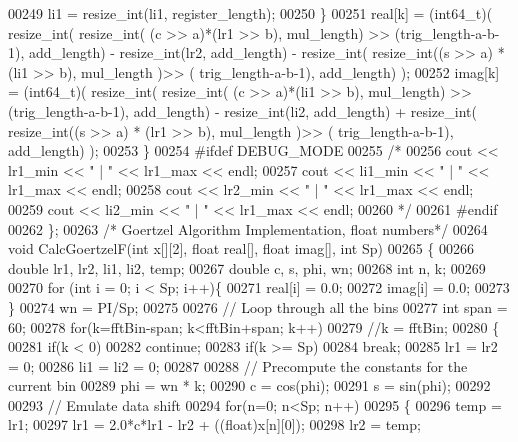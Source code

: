 \begin{DoxyCode}
00249       li1 = resize_int(li1, register\_length);
00250     \}
00251     real[k] = (int64\_t)( resize_int( resize_int( (c >> a)*(lr1 >> b), mul\_length) >> (trig\_length-a-b-1), 
      add\_length) - resize_int(lr2, add\_length) - resize_int( resize_int((s >> a) * (li1 >> b), mul\_length )>> (
      trig\_length-a-b-1), add\_length) );
00252     imag[k] = (int64\_t)( resize_int( resize_int( (c >> a)*(li1 >> b), mul\_length) >> (trig\_length-a-b-1), 
      add\_length) - resize_int(li2, add\_length) + resize_int( resize_int((s >> a) * (lr1 >> b), mul\_length )>> (
      trig\_length-a-b-1), add\_length) );
00253   \}
00254 \textcolor{preprocessor}{  #ifdef DEBUG\_MODE}
00255     \textcolor{comment}{/*}
00256 \textcolor{comment}{    cout << lr1\_min << " | " << lr1\_max << endl;}
00257 \textcolor{comment}{    cout << li1\_min << " | " << lr1\_max << endl;}
00258 \textcolor{comment}{    cout << lr2\_min << " | " << lr1\_max << endl;}
00259 \textcolor{comment}{    cout << li2\_min << " | " << lr1\_max << endl;}
00260 \textcolor{comment}{    */}
00261 \textcolor{preprocessor}{  #endif}
00262 \};
00263 \textcolor{comment}{/* Goertzel Algorithm Implementation, float numbers*/}
00264 \textcolor{keywordtype}{void} CalcGoertzelF(\textcolor{keywordtype}{int} x[][2], \textcolor{keywordtype}{float} real[], \textcolor{keywordtype}{float} imag[], \textcolor{keywordtype}{int} Sp)
00265 \{
00266   \textcolor{keywordtype}{double} lr1, lr2, li1, li2, temp;
00267   \textcolor{keywordtype}{double} c, s, phi, wn;
00268   \textcolor{keywordtype}{int} n, k;
00269 
00270     \textcolor{keywordflow}{for} (\textcolor{keywordtype}{int} i = 0; i < Sp; i++)\{
00271         real[i] = 0.0;
00272         imag[i] = 0.0;
00273     \}
00274   wn = PI/Sp;
00275 
00276   \textcolor{comment}{// Loop through all the bins}
00277   \textcolor{keywordtype}{int} span = 60;
00278   \textcolor{keywordflow}{for}(k=fftBin-span; k<fftBin+span; k++)
00279   \textcolor{comment}{//k = fftBin;}
00280   \{
00281       \textcolor{keywordflow}{if}(k < 0)
00282         \textcolor{keywordflow}{continue};
00283       \textcolor{keywordflow}{if}(k >= Sp)
00284         \textcolor{keywordflow}{break};
00285     lr1 = lr2 = 0;
00286     li1 = li2 = 0;
00287 
00288     \textcolor{comment}{// Precompute the constants for the current bin}
00289     phi = wn * k;
00290     c = cos(phi);
00291     s = sin(phi);
00292 
00293     \textcolor{comment}{// Emulate data shift}
00294     \textcolor{keywordflow}{for}(n=0; n<Sp; n++)
00295     \{
00296       temp = lr1;
00297       lr1 = 2.0*c*lr1 - lr2 + ((float)x[n][0]);
00298       lr2 = temp;

\end{DoxyCode}
